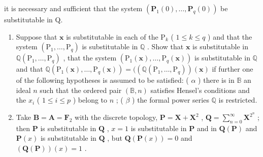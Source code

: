 it is necessary and sufficient that the system \((\mathbf{P}_{1}(0),\ldots,\mathbf{P}_{q}(0))\) be substitutable in Q.

\begin{enumerate}
\def\labelenumi{(\alph{enumi})}
\setcounter{enumi}{4}
\item
  Suppose that \(\mathbf{x}\) is substitutable in each of the \(\mathrm{P}_k\) ( \(1 \leqslant k \leqslant q\) ) and that the system \((\mathrm{P}_1, \ldots, \mathrm{P}_q)\) is substitutable in \(\mathbb{Q}\) . Show that \(\mathbf{x}\) is substitutable in \(\mathbb{Q}(\mathrm{P}_1, \ldots, \mathrm{P}_q)\) , that the system \((\mathrm{P}_1(\mathbf{x}), \ldots, \mathrm{P}_q(\mathbf{x}))\) is substitutable in \(\mathbb{Q}\) and that \(\mathbb{Q}(\mathrm{P}_1(\mathbf{x}), \ldots, \mathrm{P}_q(\mathbf{x})) = ((\mathbb{Q}(\mathrm{P}_1, \ldots, \mathrm{P}_q))(\mathbf{x})\) if further one of the following hypotheses is assumed to be satisfied: ( \(\alpha\) ) there is in \(\mathbb{B}\) an ideal \(n\) such that the ordered pair \((\mathbb{B}, n)\) satisfies Hensel's conditions and the \(x_i\) ( \(1 \leqslant i \leqslant p\) ) belong to \(n\) ; ( \(\beta\) ) the formal power series \(\mathbb{Q}\) is restricted.
\item
  Take \(\mathbf{B} = \mathbf{A} = \mathbf{F}_2\) with the discrete topology, \(\mathbf{P} = \mathbf{X} + \mathbf{X}^2\) , \(\mathbf{Q} = \sum_{n=0}^{\infty} \mathbf{X}^{2^n}\) ; then \(\mathbf{P}\) is substitutable in \(\mathbf{Q}\) , \(x = 1\) is substitutable in \(\mathbf{P}\) and in \(\mathbf{Q}(\mathbf{P})\) and \(\mathbf{P}(x)\) is substitutable in \(\mathbf{Q}\) , but \(\mathbf{Q}(\mathbf{P}(x)) = 0\) and \((\mathbf{Q}(\mathbf{P}))(x) = 1\) .
\end{enumerate}
\relax{}
